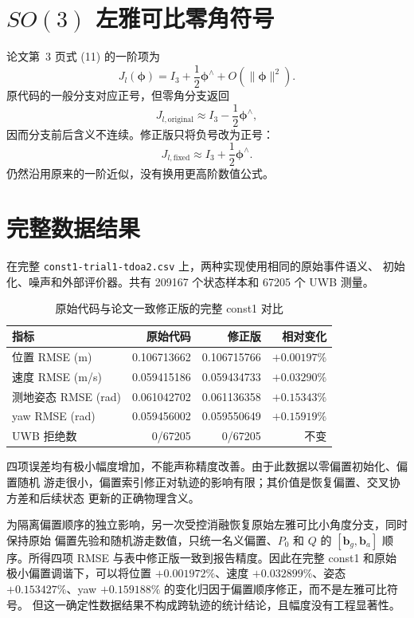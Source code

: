 \documentclass[11pt,a4paper]{ctexart}
\begin{document}
\section{\texorpdfstring{$SO(3)$}{SO(3)} 左雅可比零角符号}

论文第~3 页式 (11) 的一阶项为
\begin{equation}
 J_l(\bm\phi)
 =
 I_3+\frac{1}{2}\bm\phi^\wedge+O(\lVert\bm\phi\rVert^2).
\end{equation}
原代码的一般分支对应正号，但零角分支返回
\begin{equation}
 J_{l,\mathrm{original}}
 \approx I_3-\frac{1}{2}\bm\phi^\wedge,
\end{equation}
因而分支前后含义不连续。修正版只将负号改为正号：
\begin{equation}
 J_{l,\mathrm{fixed}}
 \approx I_3+\frac{1}{2}\bm\phi^\wedge.
\end{equation}
仍然沿用原来的一阶近似，没有换用更高阶数值公式。

\section{完整数据结果}

在完整 \texttt{const1-trial1-tdoa2.csv} 上，两种实现使用相同的原始事件语义、
初始化、噪声和外部评价器。共有 209167 个状态样本和 67205 个 UWB 测量。

\begin{table}[htbp]
\centering
\caption{原始代码与论文一致修正版的完整 const1 对比}
\begin{tabular}{lrrr}
\toprule
指标 & 原始代码 & 修正版 & 相对变化\\
\midrule
位置 RMSE (m) & 0.106713662 & 0.106715766 & $+0.00197\%$\\
速度 RMSE (m/s) & 0.059415186 & 0.059434733 & $+0.03290\%$\\
测地姿态 RMSE (rad) & 0.061042702 & 0.061136358 & $+0.15343\%$\\
yaw RMSE (rad) & 0.059456002 & 0.059550649 & $+0.15919\%$\\
UWB 拒绝数 & 0/67205 & 0/67205 & 不变\\
\bottomrule
\end{tabular}
\end{table}

四项误差均有极小幅度增加，不能声称精度改善。由于此数据以零偏置初始化、偏置随机
游走很小，偏置索引修正对轨迹的影响有限；其价值是恢复偏置、交叉协方差和后续状态
更新的正确物理含义。

为隔离偏置顺序的独立影响，另一次受控消融恢复原始左雅可比小角度分支，同时保持原始
偏置先验和随机游走数值，只统一名义偏置、$P_0$ 和 $Q$ 的
$[\bm b_g,\bm b_a]$ 顺序。所得四项 RMSE 与表中修正版一致到报告精度。因此在完整
const1 和原始极小偏置调谐下，可以将位置 $+0.001972\%$、速度 $+0.032899\%$、姿态
$+0.153427\%$、yaw $+0.159188\%$ 的变化归因于偏置顺序修正，而不是左雅可比符号。
但这一确定性数据结果不构成跨轨迹的统计结论，且幅度没有工程显著性。
\end{document}
